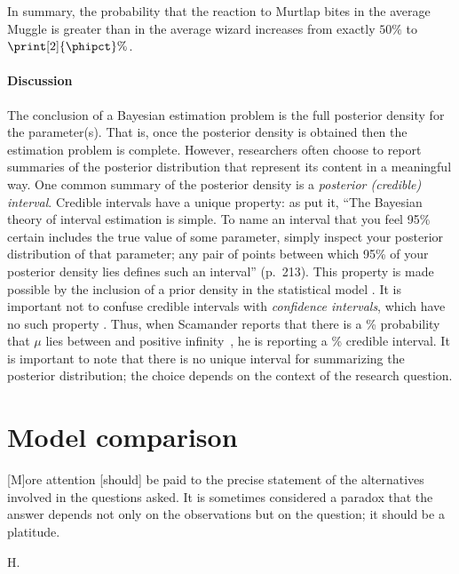 In summary, the probability that the reaction to Murtlap bites in the average Muggle is greater than in the average wizard increases from exactly $50\%$ to $\print[2]{\phipct}\%$. 

\paragraph{Discussion}
The conclusion of a Bayesian estimation problem is the full posterior density for the parameter{(s)}. That is, once the posterior density is obtained then the estimation problem is complete. However, researchers often choose to report summaries of the posterior distribution that represent its content in a meaningful way. One common summary of the posterior density is a \emph{posterior (credible) interval}. Credible intervals have a unique property: 
{as  put it, ``The Bayesian theory of interval estimation is simple. To name an interval that you feel 95\% certain includes the true value of some parameter, simply inspect your posterior distribution of that parameter; any pair of points between which 95\% of your posterior density lies defines such an interval'' (p.~213).}
{This property is made possible by the inclusion of a prior density in the statistical model \cite{Rouder2016freelunch}. It is important not to confuse credible intervals with \emph{confidence intervals}, which have no such property \cite{MoreyEtAlinpressCI}.}
Thus, when Scamander reports that there is a \print[2]{\phipct}\% probability that $\mu$ lies between \va{ }and positive infinity~\units, he is reporting a \print[2]{\phipct}\% credible interval. It is important to note that there is no unique interval for summarizing the posterior distribution; the choice depends on the context of the research question.

\section{Model comparison}
\epigraph{[M]ore attention [should] be paid to the precise statement of the alternatives involved in the questions asked. It is sometimes considered a paradox that the answer depends not only on the observations but on the question; it should be a platitude.}{H.~}

